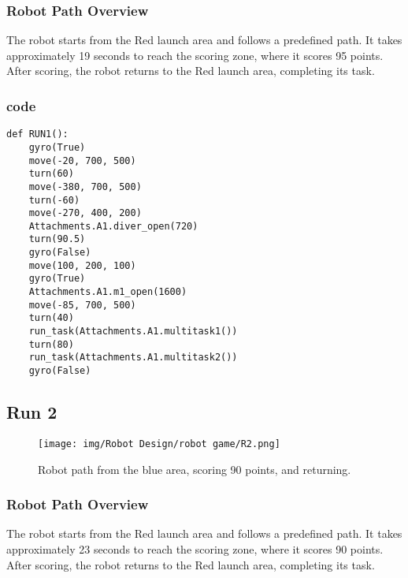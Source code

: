 \subsubsection{Robot Path Overview}

The robot starts from the Red launch area and follows a predefined path. It takes approximately 19 seconds to reach the scoring zone, where it scores 95 points. After scoring, the robot returns to the Red launch area, completing its task.
\subsubsection{code}
\begin{lstlisting}
def RUN1():
    gyro(True)
    move(-20, 700, 500) 
    turn(60)
    move(-380, 700, 500) 
    turn(-60)
    move(-270, 400, 200) 
    Attachments.A1.diver_open(720)
    turn(90.5)
    gyro(False)
    move(100, 200, 100)  
    gyro(True)
    Attachments.A1.m1_open(1600)
    move(-85, 700, 500)
    turn(40)   
    run_task(Attachments.A1.multitask1())
    turn(80)
    run_task(Attachments.A1.multitask2())
    gyro(False)
\end{lstlisting}






\newpage
\subsection{Run 2}
\begin{figure}[h]
    \centering
    \texttt{[image: img/Robot Design/robot game/R2.png]}
    \caption{Robot path from the blue area, scoring 90 points, and returning.}
    \label{fig:robot_path}
\end{figure}
\subsubsection{Robot Path Overview}

The robot starts from the Red launch area and follows a predefined path. It takes approximately 23 seconds to reach the scoring zone, where it scores 90 points. After scoring, the robot returns to the Red launch area, completing its task.
